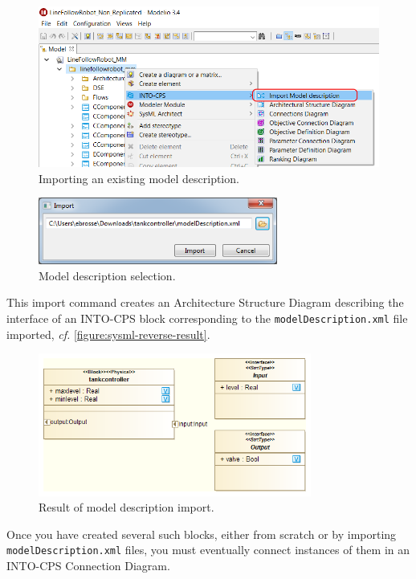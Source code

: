 %
%
\begin{figure}[hpt!]
\centering
\includegraphics[width=\textwidth]{./figures/sysml-reverse.png}
\caption{Importing an existing model description.}
\label{figure:sysml-reverse}
\end{figure}
%
%
\begin{figure}[hpt!]
\centering
\includegraphics[width=0.7\textwidth]{./figures/sysml-reverse-selection.png}
\caption{Model description selection.}
\label{figure:sysml-reverse-selection}
\end{figure}
%
%
%
This import command creates an Architecture Structure Diagram describing the interface of an INTO-CPS block corresponding to the \texttt{model\allowbreak{}Des\-crip\-tion\allowbreak{}.xml} file imported, \emph{cf.\@} \autoref{figure:sysml-reverse-result}.  
%
%
%
\begin{figure}[hpt!]
\centering
\includegraphics[width=0.8\textwidth]{./figures/sysml-reverse-result.png}
\caption{Result of model description import.}
\label{figure:sysml-reverse-result}
\end{figure}
%
%
%
Once you have created several such blocks, either from scratch or by importing \texttt{model\allowbreak{}Description\allowbreak{}.xml} files, you must eventually connect instances of them in an INTO-CPS Connection Diagram.
